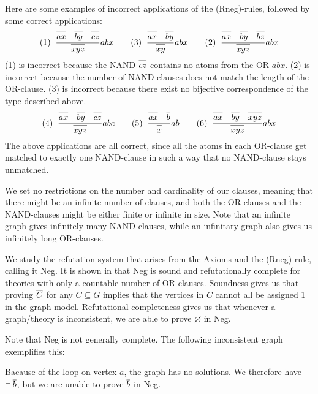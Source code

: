 Here are some examples of incorrect applications of the (Rneg)-rules, followed by some correct applications:
\begin{align}
  (1)\;\;\frac{\ol{ax}\quad\ol{by}\quad\ol{cz}}{\ol{xyz}}abx\quad\quad
  (3)\;\;\frac{\ol{ax}\quad\ol{by}}{\ol{xy}}abx\quad\quad
  (2)\;\;\frac{\ol{ax}\quad\ol{by}\quad\ol{bz}}{\ol{xyz}}abx
\end{align}
(1) is incorrect because the NAND $\ol{cz}$ contains no atoms from the OR $abx$.
(2) is incorrect because the number of NAND-clauses does not match the length of the OR-clause.
(3) is incorrect because there exist no bijective correspondence of the type described above.
\begin{align}
  (4)\;\;\frac{\ol{ax}\quad\ol{by}\quad\ol{cz}}{\ol{xyz}}abc\quad\quad
  (5)\;\;\frac{\ol{ax}\quad\ol{b}}{\ol{x}}ab\quad\quad
  (6)\;\;\frac{\ol{ax}\quad\ol{by}\quad\ol{xyz}}{\ol{xyz}}abx
\end{align}
The above applications are all correct, since all the atoms in each OR-clause get matched to exactly one NAND-clause in such a way that no NAND-clause stays unmatched.

We set no restrictions on the number and cardinality of our clauses, meaning that there might be an infinite number of clauses, and both the OR-clauses and the NAND-clauses might be either finite or infinite in size.
Note that an infinite graph gives infinitely many NAND-clauses, while an infinitary graph also gives us infinitely long OR-clauses.

We study the refutation system that arises from the Axioms and the (Rneg)-rule, calling it Neg.
It is shown in \cite{michal-completeness} that Neg is sound and refutationally complete for theories with only a countable number of OR-clauses.
Soundness gives us that proving $\ol{C}$ for any $C \subseteq G$ implies that the vertices in $C$ cannot all be assigned 1 in the graph model.
Refutational completeness gives us that whenever a graph/theory is inconsistent, we are able to prove $\varnothing$ in Neg.

Note that Neg is not generally complete.
The following inconsistent graph exemplifies this:\par
\begin{figure}[!h]
  \centering
  \caption{}
  \label{fig:neg_not_complete}
\end{figure}
Bacause of the loop on vertex $a$, the graph has no solutions.
We therefore have $\vDash \ol{b}$, but we are unable to prove $\ol{b}$ in Neg.
